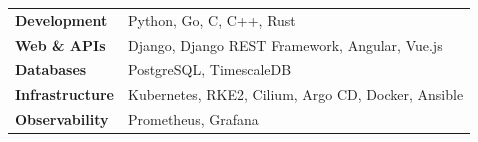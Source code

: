 \begin{tabularx}{\textwidth}{@{}lX@{}}
\textbf{Development} &
    Python, Go, C, C++, Rust \\

\textbf{Web \& APIs} &
    Django, Django REST Framework, Angular, Vue.js \\

\textbf{Databases} &
    PostgreSQL, TimescaleDB \\

\textbf{Infrastructure} &
    Kubernetes, RKE2, Cilium, Argo CD, Docker, Ansible \\

\textbf{Observability} &
    Prometheus, Grafana \\
\end{tabularx}
